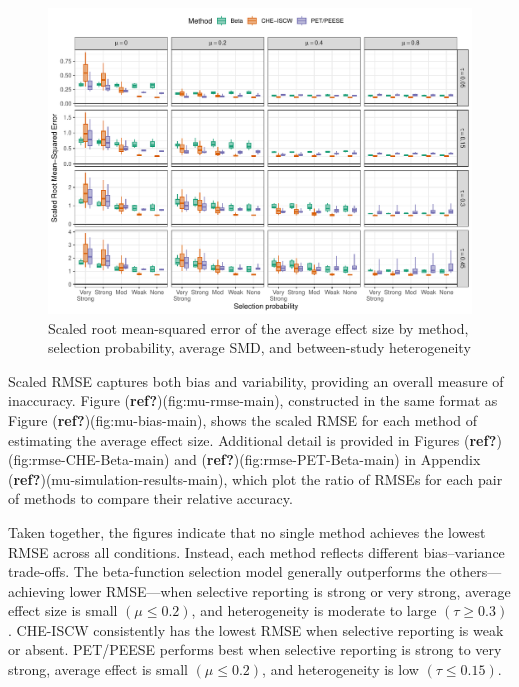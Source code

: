 \documentclass[
  american,
  man, donotrepeattitle,floatsintext]{apa7}
\begin{document}
\begin{figure}
\includegraphics{beta-function-selection-models-with-dependent-effects_files/figure-latex/mu-rmse-main-1} \caption{Scaled root mean-squared error of the average effect size by method, selection probability, average SMD, and between-study heterogeneity}\label{fig:mu-rmse-main}
\end{figure}

Scaled RMSE captures both bias and variability, providing an overall measure of inaccuracy. Figure (\textbf{ref?})(fig:mu-rmse-main), constructed in the same format as Figure (\textbf{ref?})(fig:mu-bias-main), shows the scaled RMSE for each method of estimating the average effect size. Additional detail is provided in Figures (\textbf{ref?})(fig:rmse-CHE-Beta-main) and (\textbf{ref?})(fig:rmse-PET-Beta-main) in Appendix (\textbf{ref?})(mu-simulation-results-main), which plot the ratio of RMSEs for each pair of methods to compare their relative accuracy.

Taken together, the figures indicate that no single method achieves the lowest RMSE across all conditions. Instead, each method reflects different bias--variance trade-offs.
The beta-function selection model generally outperforms the others---achieving lower RMSE---when selective reporting is strong or very strong, average effect size is small \((\mu \leq 0.2)\), and heterogeneity is moderate to large \((\tau \geq 0.3)\).
CHE-ISCW consistently has the lowest RMSE when selective reporting is weak or absent.
PET/PEESE performs best when selective reporting is strong to very strong, average effect is small \((\mu \leq 0.2)\), and heterogeneity is low \((\tau \leq 0.15)\).
\end{document}
